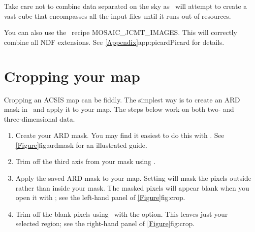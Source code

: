 \documentclass[11pt,oneside,chapters]{starlink}
\begin{document}
\begin{tip}
Take care not to combine data separated on the sky as \wcsmosaic\
will attempt to create a vast cube that encompasses all the input
files until it runs out of resources.
\end{tip}

\begin{tip}
You can also use the \picard\ recipe MOSAIC\_JCMT\_IMAGES. This
will correctly combine all NDF extensions. See
\cref{Appendix}{app:picard}{Picard} for details.
\end{tip}

\newpage
\section{Cropping your map}
\label{sec:collapse}

Cropping an ACSIS map can be fiddly. The simplest way is to create an
ARD mask in \gaia\ and apply it to your map. The steps below work on
both two- and three-dimensional data.

\begin{enumerate}[label=(\arabic*)]
\item Create your ARD mask. You may find it easiest to do this with
\gaia. See \cref{Figure}{fig:ardmask}{} for an illustrated guide.

\item Trim off the third axis from your mask using \ndfcopy.
\begin{terminalv}
\end{terminalv}

\item Apply the saved ARD mask to your map. Setting
 will mask the pixels outside rather than inside
your mask. The masked pixels will appear blank when you open it with
\gaia; see the left-hand panel of \cref{Figure}{fig:crop}{}.
\begin{terminalv}
\end{terminalv}

\item Trim off the blank pixels using \ndfcopy\ with the
 option. This leaves just your selected region; see the
right-hand panel of \cref{Figure}{fig:crop}{}.
\begin{terminalv}
\end{terminalv}
\end{enumerate}
\end{document}
